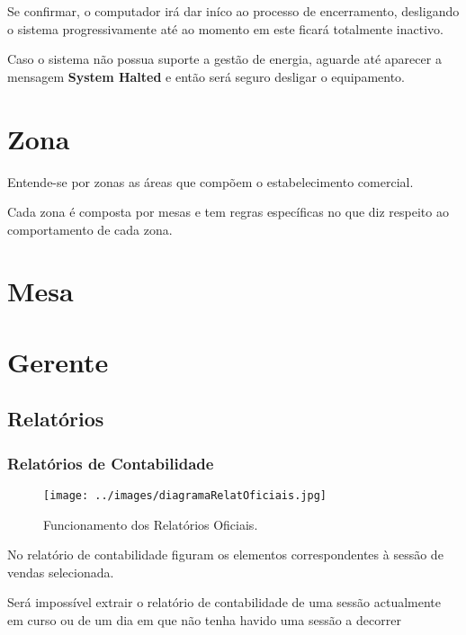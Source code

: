 \documentclass[a4paper,11pt,openany]{memoir}
\begin{document}
Se confirmar, o computador irá dar iníco ao processo de encerramento, desligando o sistema progressivamente
até ao momento em este ficará totalmente inactivo.

\begin{boxedminipage}{\textwidth}
        Caso o sistema não possua suporte a gestão de energia,
	aguarde até aparecer a mensagem \textbf{System Halted} e então será seguro desligar o equipamento.
\end{boxedminipage}



\chapter{Zona}

Entende-se por zonas as áreas que compõem o estabelecimento comercial.

Cada zona é composta por mesas e tem regras específicas no que diz respeito ao comportamento de cada zona.




\chapter{Mesa}

\chapter{Gerente}

\section{Relatórios}

\subsection{Relatórios de Contabilidade}

\begin{figure}
\texttt{[image: ../images/diagramaRelatOficiais.jpg]}
\caption[Submanifold]{Funcionamento dos Relatórios Oficiais.}
\end{figure}

No relatório de contabilidade figuram os elementos correspondentes à sessão de vendas selecionada.

Será impossível extrair o relatório de contabilidade de uma sessão actualmente em curso ou de
 um dia em que não tenha havido uma sessão a decorrer
\end{document}
